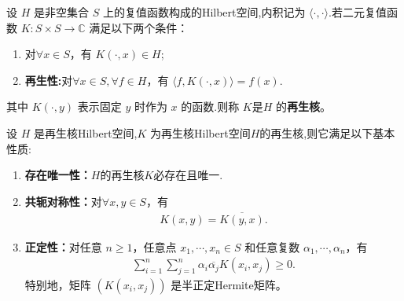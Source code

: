\documentclass[../../main.tex]{subfiles}%
\begin{document}
\begin{definition}[再生核]
设 $H$ 是非空集合 $S$ 上的复值函数构成的Hilbert空间,内积记为 $\langle \cdot,\cdot\rangle$.若二元复值函数 $K:S\times S\to\mathbb C$ 满足以下两个条件：
\begin{enumerate}[(1)]
\item 对$\forall x\in S$，有 $K(\cdot,x)\in H$;
\item \textbf{再生性:}对$\forall x\in S,\forall f\in H$，有 $\langle f,K(\cdot,x)\rangle=f(x)$.
\end{enumerate}
其中 $K(\cdot,y)$ 表示固定 $y$ 时作为 $x$ 的函数.则称 $K$是$H$ 的\textbf{再生核}。
\end{definition}

\begin{theorem}[再生核的基本性质]\label{theorem:再生核的基本性质}
设 $H$ 是再生核Hilbert空间,$K$ 为再生核Hilbert空间$H$的再生核,则它满足以下基本性质:
\begin{enumerate}[(1)]
\item \textbf{存在唯一性：}$H$的再生核$K$必存在且唯一.

\item \textbf{共轭对称性：}对$\forall x,y\in S$，有
\begin{align*}
K(x,y)=\overline{K(y,x)}.
\end{align*}
\item \textbf{正定性：}对任意 $n\geqslant 1$，任意点 $x_1,\cdots,x_n\in S$ 和任意复数 $\alpha_1,\cdots,\alpha_n$，有
\begin{align*}
\sum_{i=1}^n\sum_{j=1}^n \alpha_i\overline{\alpha_j}K(x_i,x_j)\geqslant 0.
\end{align*}
特别地，矩阵 $(K(x_i,x_j))$ 是半正定Hermite矩阵。
\end{enumerate}
\end{theorem}
\end{document}
